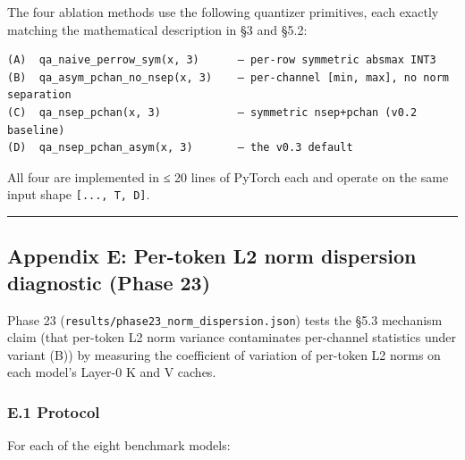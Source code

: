 The four ablation methods use the following quantizer primitives, each
exactly matching the mathematical description in §3 and §5.2:

\begin{verbatim}
(A)  qa_naive_perrow_sym(x, 3)      — per-row symmetric absmax INT3
(B)  qa_asym_pchan_no_nsep(x, 3)    — per-channel [min, max], no norm separation
(C)  qa_nsep_pchan(x, 3)            — symmetric nsep+pchan (v0.2 baseline)
(D)  qa_nsep_pchan_asym(x, 3)       — the v0.3 default
\end{verbatim}

All four are implemented in ≤ 20 lines of PyTorch each and operate on
the same input shape \texttt{{[}...,\ T,\ D{]}}.

\begin{center}\rule{0.5\linewidth}{0.5pt}\end{center}

\subsection{Appendix E: Per-token L2 norm dispersion diagnostic (Phase
23)}\label{appendix-e-per-token-l2-norm-dispersion-diagnostic-phase-23}

Phase 23 (\texttt{results/phase23\_norm\_dispersion.json}) tests the
§5.3 mechanism claim (that per-token L2 norm variance contaminates
per-channel statistics under variant (B)) by measuring the coefficient
of variation of per-token L2 norms on each model's Layer-0 K and V
caches.

\subsubsection{E.1 Protocol}\label{e.1-protocol}

For each of the eight benchmark models:

